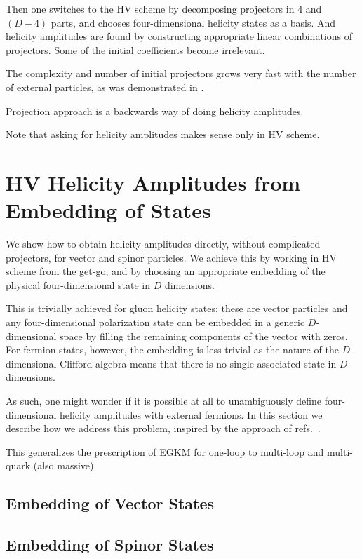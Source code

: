 Then one switches to the HV scheme by decomposing projectors in $4$ and $(D-4)$ parts,
and chooses four-dimensional helicity states as a basis.
And helicity amplitudes are found by constructing appropriate linear combinations of projectors.
Some of the initial coefficients become irrelevant.

The complexity and number of initial projectors grows very fast with the number of external particles, as was demonstrated in \cite{Peraro:2019cjj}.

Projection approach is a backwards way of doing helicity amplitudes.

Note that asking for helicity amplitudes makes sense only in HV scheme.


\section{HV Helicity Amplitudes from Embedding of States}

We show how to obtain helicity amplitudes directly, without complicated projectors,
for vector and spinor particles.
We achieve this by working in HV scheme from the get-go, and by
choosing an appropriate embedding of the physical four-dimensional state in $D$ dimensions.

This is trivially achieved for gluon helicity states: these
are vector particles and any four-dimensional polarization state
can be embedded in a generic $D$-dimensional space by filling 
the remaining components of the vector with zeros. 
For fermion states, however, the embedding is less trivial as 
the nature of the $D$-dimensional Clifford algebra means that
there is no single associated state in $D$-dimensions.  

As such, one might wonder if it is possible at all to unambiguously 
define four-dimensional helicity amplitudes with external
fermions. In this section we describe how we
address this problem, inspired by the approach of
refs.~\cite{Glover:2003cm,Glover:2004si}.
 
This generalizes the prescription of EGKM for one-loop to multi-loop and
multi-quark (also massive).

\subsection{Embedding of Vector States}

\subsection{Embedding of Spinor States}
\label{sec:Clifford}


